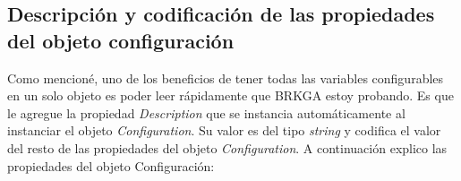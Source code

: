 \bigskip

\subsection{Descripción y codificación de las propiedades del objeto configuración}\label{sec:descrCongif}

Como mencioné, uno de los beneficios de tener todas las variables configurables en un solo objeto es poder leer rápidamente que BRKGA estoy probando. Es que le agregue la propiedad \textit{Description} que se instancia automáticamente al instanciar el objeto \textit{Configuration}. Su valor es del tipo \textit{string} y codifica el valor del resto de las propiedades del objeto \textit{Configuration}. A continuación explico las propiedades del objeto Configuración:

